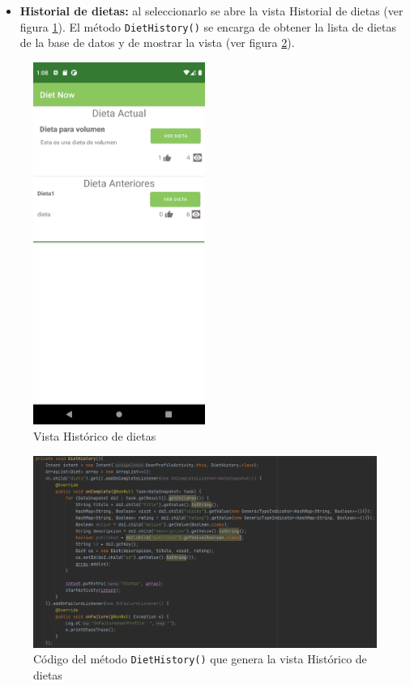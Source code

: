 \begin{itemize}
    \begin{itemize}
        \item \textbf{Historial de dietas:} al seleccionarlo se abre la vista Historial de dietas (ver figura \ref{fig:historialdietas}). El método \texttt{DietHistory()} se encarga de obtener la lista de dietas de la base de datos y de mostrar la vista (ver figura \ref{fig:diethistory}).
    \end{itemize}
\end{itemize}    
\begin{figure}[H]
    \centering
    \includegraphics[width=0.5\textwidth]{Images/Capitulo7/historialdietas.png}
    \caption{Vista Histórico de dietas}
    \label{fig:historialdietas}
\end{figure}
\begin{figure}[H]
    \centering
    \includegraphics[width=\textwidth]{Images/Capitulo7/diethistory.png}
    \caption{Código del método \texttt{DietHistory()} que genera la vista Histórico de dietas}
    \label{fig:diethistory}
\end{figure}
    
